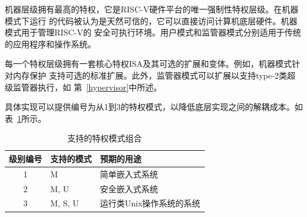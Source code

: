 
机器层级拥有最高的特权，它是RISC-V硬件平台的唯一强制性特权层级。在机器模式下运行
的代码被认为是天然可信的，它可以直接访问计算机底层硬件。机器模式用于管理RISC-V的
安全可执行环境。用户模式和监管器模式分别适用于传统的应用程序和操作系统。


每一个特权层级拥有一套核心特权ISA及其可选的扩展和变体。例如，机器模式针对内存保护
支持可选的标准扩展。此外，监管器模式可以扩展以支持type-2类超级监管器执行，如
第~\ref{hypervisor}中所述。



具体实现可以提供编号为从1到3的特权模式，以降低底层实现之间的解耦成本。如表~\ref{privcombs}所示。


\begin{table}[h!]
\begin{center}
\begin{tabular}{|c|l|l|}
  \hline
   级别编号 &  支持的模式 & 预期的用途 \\ \hline  
   1     & M          & 简单嵌入式系统 \\ 
   2     & M, U       & 安全嵌入式系统 \\ 
   3     & M, S, U    & 运行类Unix操作系统的系统\\ 
  \hline
 \end{tabular}
\end{center}
\caption{支持的特权模式组合
  }
\label{privcombs}
\end{table}


